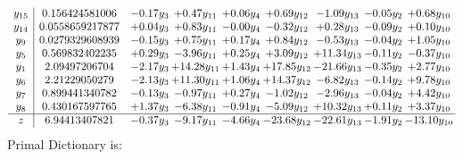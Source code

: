 \documentclass[9pt]{article}
\begin{document}
\[\begin{array}{c| c c@{\hskip 2pt} c@{\hskip 2pt} c@{\hskip 2pt} c@{\hskip 2pt} c@{\hskip 2pt} c@{\hskip 2pt} c@{\hskip 2pt} }
 y_{15}   &  0.156424581006 & -0.17 y_{3} & +  0.47 y_{11} & +  0.06 y_{4} & +  0.69 y_{12} & -1.09 y_{13} & -0.05 y_{2} & +  0.68 y_{10}\\
 y_{14}   &  0.0558659217877 & +  0.04 y_{3} & +  0.83 y_{11} & -0.00 y_{4} & -0.32 y_{12} & +  0.28 y_{13} & -0.09 y_{2} & +  0.10 y_{10}\\
 y_{9}   &  0.0279329608939 & -0.15 y_{3} & +  0.75 y_{11} & +  0.17 y_{4} & +  0.84 y_{12} & -0.53 y_{13} & -0.04 y_{2} & +  1.05 y_{10}\\
 y_{5}   &  0.569832402235 & +  0.29 y_{3} & -3.96 y_{11} & +  0.25 y_{4} & +  3.09 y_{12} & + 11.34 y_{13} & -0.11 y_{2} & -0.37 y_{10}\\
 y_{1}   &  2.09497206704 & -2.17 y_{3} & + 14.28 y_{11} & +  1.43 y_{4} & + 17.85 y_{12} & -21.66 y_{13} & -0.35 y_{2} & +  2.77 y_{10}\\
 y_{6}   &  2.21229050279 & -2.13 y_{3} & + 11.30 y_{11} & +  1.06 y_{4} & + 14.37 y_{12} & -6.82 y_{13} & -0.14 y_{2} & +  9.78 y_{10}\\
 y_{7}   &  0.899441340782 & -0.13 y_{3} & -0.97 y_{11} & +  0.27 y_{4} & -1.02 y_{12} & -2.96 y_{13} & -0.04 y_{2} & +  4.42 y_{10}\\
 y_{8}   &  0.430167597765 & +  1.37 y_{3} & -6.38 y_{11} & -0.91 y_{4} & -5.09 y_{12} & + 10.32 y_{13} & +  0.11 y_{2} & +  3.37 y_{10}\\
\hline
z    &  6.94413407821 & -0.37 y_{3} & -9.17 y_{11} & -4.66 y_{4} & -23.68 y_{12} & -22.61 y_{13} & -1.91 y_{2} & -13.10 y_{10}\\
\end{array}\]
Primal Dictionary is:
\end{document}
